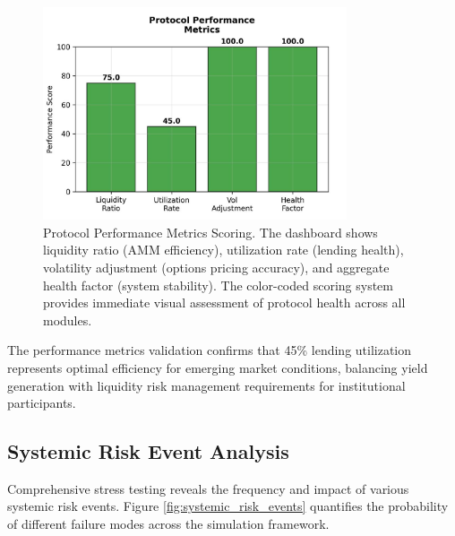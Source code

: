 \documentclass[12pt]{article}
\begin{document}
\begin{figure}[h]
    \centering
    \includegraphics[width=0.8\textwidth]{performance_metrics.jpeg}
    \caption{Protocol Performance Metrics Scoring. The dashboard shows liquidity ratio (AMM efficiency), utilization rate (lending health), volatility adjustment (options pricing accuracy), and aggregate health factor (system stability). The color-coded scoring system provides immediate visual assessment of protocol health across all modules.}
    \label{fig:performance_metrics}
\end{figure}

The performance metrics validation confirms that 45\% lending utilization represents optimal efficiency for emerging market conditions, balancing yield generation with liquidity risk management requirements for institutional participants.

\subsection{Systemic Risk Event Analysis}

Comprehensive stress testing reveals the frequency and impact of various systemic risk events. Figure \ref{fig:systemic_risk_events} quantifies the probability of different failure modes across the simulation framework.
\end{document}
